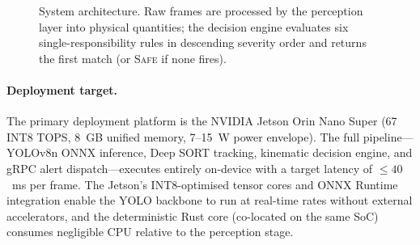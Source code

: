 \documentclass[conference, a4paper]{IEEEtran}
\theoremstyle{plain}
\begin{document}
\begin{figure}[t]
\caption{System architecture. Raw frames are processed by the perception
layer into physical quantities; the decision engine evaluates six
single-responsibility rules in descending severity order and returns the
first match (or \textsc{Safe} if none fires).}
\label{fig:arch}
\end{figure}

\paragraph{Deployment target.} The primary deployment platform is the
NVIDIA Jetson Orin Nano Super (67 INT8 TOPS, 8~GB unified memory,
7--15~W power envelope). The full pipeline---YOLOv8n ONNX inference,
Deep SORT tracking, kinematic decision engine, and gRPC alert
dispatch---executes entirely on-device with a target latency of
$\leq 40$~ms per frame. The Jetson's INT8-optimised tensor cores and
ONNX Runtime integration enable the YOLO backbone to run at real-time
rates without external accelerators, and the deterministic Rust core
(co-located on the same SoC) consumes negligible CPU relative to the
perception stage.
\end{document}
